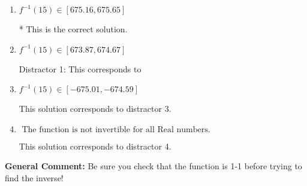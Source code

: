 \documentclass{extbook}[14pt]
\begin{document}
\begin{enumerate}
{\begin{enumerate}[label=\Alph*.]
 This solution corresponds to distractor 2.
\item \( f^{-1}(15) \in [675.16, 675.65] \)

* This is the correct solution.
\item \( f^{-1}(15) \in [673.87, 674.67] \)

 Distractor 1: This corresponds to 
\item \( f^{-1}(15) \in [-675.01, -674.59] \)

 This solution corresponds to distractor 3.
\item \( \text{ The function is not invertible for all Real numbers. } \)

 This solution corresponds to distractor 4.
\end{enumerate}

\textbf{General Comment:} Be sure you check that the function is 1-1 before trying to find the inverse!
}
\end{enumerate}
\end{document}
